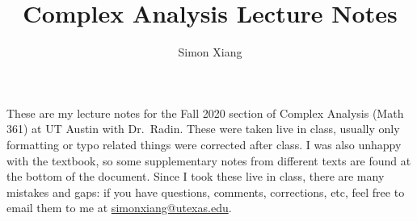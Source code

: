 \documentclass[fontsize=9pt]{article}
\date{}
\author{Simon Xiang}
\title{Complex Analysis Lecture Notes}
\begin{document}
\maketitle
These are my lecture notes for the Fall 2020 section of Complex Analysis (Math 361) at UT Austin with Dr.\ Radin. These were taken live in class, usually only formatting or typo related things were corrected after class. I was also unhappy with the textbook, so some supplementary notes from different texts are found at the bottom of the document. Since I took these live in class, there are many mistakes and gaps: if you have questions, comments, corrections, etc, feel free to email them to me at \url{simonxiang@utexas.edu}.
\tableofcontents
    \newpage
    
    
    
    
    
    
    
    
    
    
    
    
    
    
    
    
    
    
    
    
    
    
\end{document}
